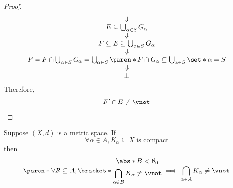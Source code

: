 \begin{proof}
\[\begin{array}{c}
      \Downarrow                                                                    \\
      E \subseteq \bigcup_{\alpha \in S} G_{\alpha}                                 \\
      \Downarrow                                                                    \\
      F \subseteq E \subseteq \bigcup_{\alpha \in S} G_{\alpha}                     \\
      \Downarrow                                                                    \\
      F = F \cap \bigcup_{\alpha \in S} G_{\alpha} = \bigcup_{\alpha \in S}
      \paren*{F \cap G_{\alpha}} \subseteq \bigcup_{\alpha \in S} \set*{\alpha} = S \\
      \Downarrow                                                                    \\
      \bot
    \end{array}
  \]
  Therefore,
  \[
    F' \cap E \neq \vnot
  \]
\end{proof}

\bigskip

\begin{theorem} \label{an:thm:finite-compact-intersection-property}
  Suppose $(X, d)$ is a metric space. If
  \[
    \forall \alpha \in A, K_{\alpha} \subseteq X \text{ is compact}
  \]
  then
  \[
    \paren*{\forall B \subseteq A,
      \bracket*{\begin{gathered}
          \abs*{B} < \aleph_{0} \\
          \bigcap_{\alpha \in B} K_{\alpha} \neq \vnot
        \end{gathered}}} \implies \bigcap_{\alpha \in A} K_{\alpha} \neq \vnot
  \]
\end{theorem}
